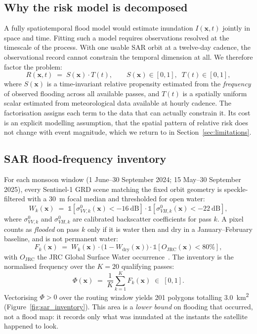 \documentclass[11pt,a4paper]{article}
\newcommand{\Sx}{S(\mathbf{x})}
\newcommand{\Tt}{T(t)}
\newcommand{\Rxt}{R(\mathbf{x},t)}
\begin{document}
\subsection{Why the risk model is decomposed}
\label{sec:method-decomp}
A fully spatiotemporal flood model would estimate inundation
$I(\mathbf{x},t)$ jointly in space and time. Fitting such a model requires
observations resolved at the timescale of the process. With one usable SAR orbit
at a twelve-day cadence, the observational record cannot constrain the temporal
dimension at all. We therefore factor the problem:
\begin{equation}
\Rxt \;=\; \Sx \cdot \Tt,
\qquad \Sx\in[0,1],\;\; \Tt\in[0,1],
\label{eq:fusion}
\end{equation}
where $\Sx$ is a time-invariant relative propensity estimated from the
\emph{frequency} of observed flooding across all available passes, and $\Tt$ is a
spatially uniform scalar estimated from meteorological data available at hourly
cadence. The factorisation assigns each term to the data that can actually
constrain it. Its cost is an explicit modelling assumption, that the spatial
pattern of relative risk does not change with event magnitude, which we return to
in Section~\ref{sec:limitations}.

\subsection{SAR flood-frequency inventory}
For each monsoon window (1 June--30 September 2024; 15 May--30 September 2025),
every Sentinel-1 GRD scene matching the fixed orbit geometry is speckle-filtered
with a \SI{30}{\metre} focal median and thresholded for open water:
\begin{equation}
W_k(\mathbf{x}) \;=\;
\mathbb{1}\!\left[\sigma^0_{VV,k}(\mathbf{x}) < \SI{-16}{\deci\bel}\right]\cdot
\mathbb{1}\!\left[\sigma^0_{VH,k}(\mathbf{x}) < \SI{-22}{\deci\bel}\right],
\label{eq:water}
\end{equation}
where $\sigma^0_{VV,k}$ and $\sigma^0_{VH,k}$ are calibrated backscatter
coefficients for pass $k$. A pixel counts as \emph{flooded} on pass $k$ only if it
is water then and dry in a January--February baseline, and is not permanent water:
\begin{equation}
F_k(\mathbf{x}) \;=\; W_k(\mathbf{x})\cdot\bigl(1-W_{\text{dry}}(\mathbf{x})\bigr)
\cdot\mathbb{1}\!\left[O_{\text{JRC}}(\mathbf{x}) < 80\%\right],
\label{eq:floodpass}
\end{equation}
with $O_{\text{JRC}}$ the JRC Global Surface Water occurrence~\citep{pekel2016}.
The inventory is the normalised frequency over the $K=20$ qualifying passes:
\begin{equation}
\Phi(\mathbf{x}) \;=\; \frac{1}{K}\sum_{k=1}^{K} F_k(\mathbf{x}) \;\in\; [0,1].
\label{eq:freq}
\end{equation}
Vectorising $\Phi>0$ over the routing window yields 201 polygons totalling
\SI{3.0}{\kilo\metre\squared} (Figure~\ref{fig:sar_inventory}). This area is a
\emph{lower bound} on flooding that occurred, not a flood map: it records only
what was inundated at the instants the satellite happened to look.
\end{document}
